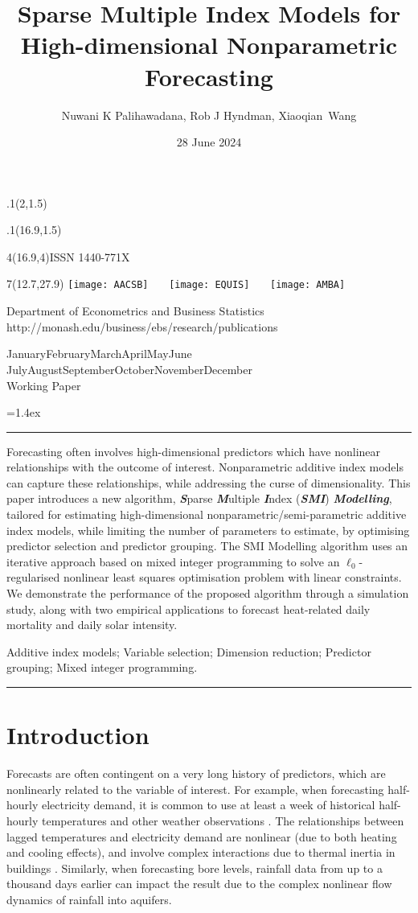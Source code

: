 \documentclass[
  11pt,
  a4paper,
]{article}
\title{Sparse Multiple Index Models for High-dimensional Nonparametric
Forecasting}
\date{28 June 2024}
\author{Nuwani K Palihawadana, Rob J Hyndman, Xiaoqian~Wang}
\makeatletter
\def\placefig#1#2#3#4{\begin{textblock}{.1}(#1,#2)\rlap{\texttt{[image: \#4]}}\end{textblock}}
\def\Date{\number\day}
\def\Month{\ifcase\month\or
 January\or February\or March\or April\or May\or June\or
 July\or August\or September\or October\or November\or December\fi}
\def\Year{\number\year}
\def\showjel{{\large\textsf{\textbf{JEL classification:}}~\@jel}}
\def\cover{{\sffamily\setcounter{page}{0}
        \thispagestyle{empty}
        \placefig{2}{1.5}{width=5cm}{monash2}
        \placefig{16.9}{1.5}{width=2.1cm}{MBSportrait}
        \begin{textblock}{4}(16.9,4)ISSN 1440-771X\end{textblock}
        \begin{textblock}{7}(12.7,27.9)\hfill
        \texttt{[image: AACSB]}~~~
        \texttt{[image: EQUIS]}~~~
        \texttt{[image: AMBA]}
        \end{textblock}
        \vspace*{2.5cm}
        \begin{center}\Large
        Department of Econometrics and Business Statistics\\[.5cm]
        \footnotesize http://monash.edu/business/ebs/research/publications
        \end{center}\vspace{2cm}
        \begin{center}
        \fbox{\parbox{14cm}{\begin{onehalfspace}\centering\Huge\vspace*{0.3cm}
                \textsf{\textbf{\expandafter{\@title}}}\vspace{1cm}\par
                \LARGE
                \expandafter{\@author}
                \end{onehalfspace}
        }}
        \end{center}
        \vfill
                \begin{center}\Large
                \Month~\Year\\[1cm]
                Working Paper \@wp
        \end{center}\vspace*{2cm}}}
\def\pageone{{\sffamily\setstretch{1}%
        \thispagestyle{empty}%
        \vbox to \textheight{%
        \raggedright\baselineskip=1.2cm
     {\fontsize{24.88}{30}\sffamily\textbf{\expandafter{\@title}}}
        \vspace{2cm}\par
        \hspace{1cm}\parbox{14cm}{\sffamily\large\@addresses}\vspace{1cm}\vfill
        \hspace{1cm}{\large\Date~\Month~\Year}\\[1cm]
        \hspace{1cm}\showjel\vss}}}
\def\blindtitle{{\sffamily
     \thispagestyle{plain}\raggedright\baselineskip=1.2cm
     {\fontsize{24.88}{30}\sffamily\textbf{\expandafter{\@title}}}\vspace{1cm}\par
        }}
\def\titlepage{{\cover\newpage\pageone\newpage\blindtitle}}
\let\maketitle\titlepage
\newenvironment{keywords}{\par\vspace{0.5cm}\noindent{\sffamily\textbf{Keywords:}}}{\vspace{0.25cm}\par\hrule\vspace{0.5cm}\par}
\renewenvironment{abstract}{\begin{minipage}{\textwidth}\parskip=1.4ex\noindent
\hrule\vspace{0.1cm}\par{\sffamily\textbf{\abstractname}}\newline\setstretch{1.5}}
  {\end{minipage}}
\makeatother
\begin{document}
\maketitle

\begin{abstract}
Forecasting often involves high-dimensional predictors which have
nonlinear relationships with the outcome of interest. Nonparametric
additive index models can capture these relationships, while addressing
the curse of dimensionality. This paper introduces a new algorithm,
\textbf{\emph{S}}parse \textbf{\emph{M}}ultiple \textbf{\emph{I}}ndex
(\textbf{\emph{SMI}}) \textbf{\emph{Modelling}}, tailored for estimating
high-dimensional nonparametric/semi-parametric additive index models,
while limiting the number of parameters to estimate, by optimising
predictor selection and predictor grouping. The SMI Modelling algorithm
uses an iterative approach based on mixed integer programming to solve
an \(\ell_{0}\)-regularised nonlinear least squares optimisation problem
with linear constraints. We demonstrate the performance of the proposed
algorithm through a simulation study, along with two empirical
applications to forecast heat-related daily mortality and daily solar
intensity.
\end{abstract}

\begin{keywords}
  Additive index models; Variable selection; Dimension
reduction; Predictor grouping; 
  Mixed integer programming.
\end{keywords}

\section{Introduction}\label{sec-introduction}

Forecasts are often contingent on a very long history of predictors,
which are nonlinearly related to the variable of interest. For example,
when forecasting half-hourly electricity demand, it is common to use at
least a week of historical half-hourly temperatures and other weather
observations \autocite{HF2010}. The relationships between lagged
temperatures and electricity demand are nonlinear (due to both heating
and cooling effects), and involve complex interactions due to thermal
inertia in buildings \autocite{FH2012}. Similarly, when forecasting bore
levels, rainfall data from up to a thousand days earlier can impact the
result \autocite{Peterson2014,Bakker2019,Rajaee2019} due to the complex
nonlinear flow dynamics of rainfall into aquifers.
\end{document}
